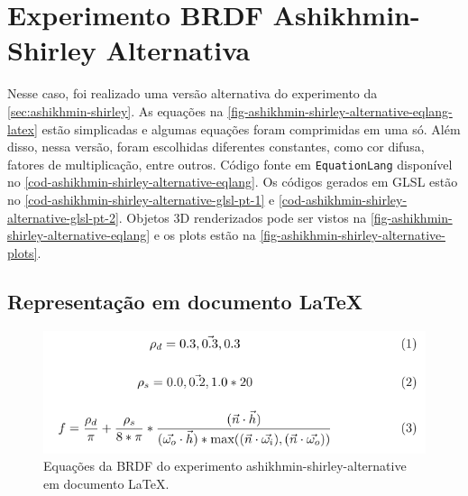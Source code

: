 \section{Experimento BRDF Ashikhmin-Shirley Alternativa}


Nesse caso, foi realizado uma versão alternativa do experimento da \autoref{sec:ashikhmin-shirley}. As equações na \autoref{fig-ashikhmin-shirley-alternative-eqlang-latex} estão simplicadas e algumas equações foram comprimidas em uma só. Além disso, nessa versão, foram escolhidas diferentes constantes, como cor difusa, fatores de multiplicação, entre outros. Código fonte em \texttt{EquationLang} disponível no \autoref{cod-ashikhmin-shirley-alternative-eqlang}. Os códigos gerados em GLSL estão no \autoref{cod-ashikhmin-shirley-alternative-glsl-pt-1} e \autoref{cod-ashikhmin-shirley-alternative-glsl-pt-2}. Objetos 3D renderizados pode ser vistos na \autoref{fig-ashikhmin-shirley-alternative-eqlang} e os plots estão na \autoref{fig-ashikhmin-shirley-alternative-plots}.
\subsection{Representação em documento \LaTeX{}}
\begin{figure}[H]
    \caption{\label{fig-ashikhmin-shirley-alternative-eqlang-latex} \small Equações da BRDF do experimento ashikhmin-shirley-alternative em documento \LaTeX{}.}
    \begin{center}
        \includegraphics[scale=0.92]{./Imagens/brdfs/ashikhmin-shirley-alternative.pdf}
    \end{center}
\end{figure}

